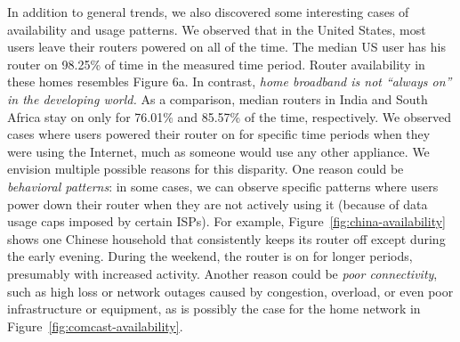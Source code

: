 In addition to general trends, we also discovered some interesting cases of
availability and usage patterns.  We observed that in the United States, most
users leave their routers powered on all of the time.
The median US user has his router on 98.25\% of time in the measured time period.
Router availability in these homes resembles Figure 6a.
In contrast, 
{\em home broadband is not ``always on'' in the developing world.}
As a comparison, median routers in India and South Africa stay on only for 76.01\% and 
85.57\% of the time, respectively.  
We observed cases where users powered their router on for specific
time periods when they were using the Internet, much as someone would use any
other appliance. 
We envision multiple
possible reasons for this disparity. One reason could be {\em behavioral patterns}: in some
cases, we can observe specific patterns where users power down their
router when they are not actively using it (because of data usage caps
imposed by certain ISPs).  For example,
Figure~\ref{fig:china-availability} shows one Chinese household that
consistently keeps its router off except during the early
evening. During the weekend, the router is on for longer periods,
presumably with increased activity.  
Another reason could be {\em poor
  connectivity}, such as high loss or network outages caused by
congestion, overload, or even poor infrastructure or
equipment, as is possibly the case for the home network in
Figure~\ref{fig:comcast-availability}.
